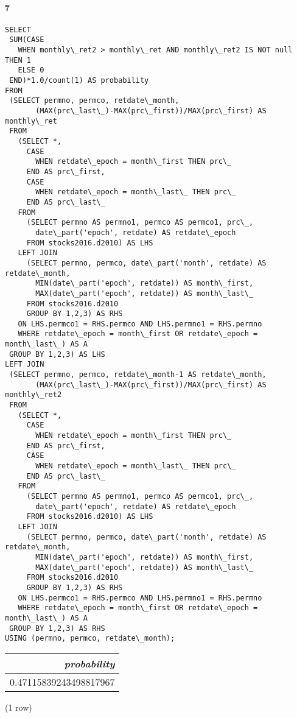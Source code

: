 \documentclass[]{article}
\let\oldparagraph\paragraph
\renewcommand{\paragraph}[1]{\oldparagraph{#1}\mbox{}}
\begin{document}
\paragraph{7}

\color{blue}
\begin{verbatim}
SELECT
 SUM(CASE
   WHEN monthly\_ret2 > monthly\_ret AND monthly\_ret2 IS NOT null THEN 1
   ELSE 0
 END)*1.0/count(1) AS probability
FROM
 (SELECT permno, permco, retdate\_month,
       (MAX(prc\_last\_)-MAX(prc\_first))/MAX(prc\_first) AS monthly\_ret
 FROM
   (SELECT *,
     CASE
       WHEN retdate\_epoch = month\_first THEN prc\_
     END AS prc\_first,
     CASE
       WHEN retdate\_epoch = month\_last\_ THEN prc\_
     END AS prc\_last\_
   FROM
     (SELECT permno AS permno1, permco AS permco1, prc\_,
       date\_part('epoch', retdate) AS retdate\_epoch
     FROM stocks2016.d2010) AS LHS
   LEFT JOIN
     (SELECT permno, permco, date\_part('month', retdate) AS retdate\_month,
       MIN(date\_part('epoch', retdate)) AS month\_first,
       MAX(date\_part('epoch', retdate)) AS month\_last\_
     FROM stocks2016.d2010
     GROUP BY 1,2,3) AS RHS
   ON LHS.permco1 = RHS.permco AND LHS.permno1 = RHS.permno
   WHERE retdate\_epoch = month\_first OR retdate\_epoch = month\_last\_) AS A
 GROUP BY 1,2,3) AS LHS
LEFT JOIN
 (SELECT permno, permco, retdate\_month-1 AS retdate\_month,
       (MAX(prc\_last\_)-MAX(prc\_first))/MAX(prc\_first) AS monthly\_ret2
 FROM
   (SELECT *,
     CASE
       WHEN retdate\_epoch = month\_first THEN prc\_
     END AS prc\_first,
     CASE
       WHEN retdate\_epoch = month\_last\_ THEN prc\_
     END AS prc\_last\_
   FROM
     (SELECT permno AS permno1, permco AS permco1, prc\_,
       date\_part('epoch', retdate) AS retdate\_epoch
     FROM stocks2016.d2010) AS LHS
   LEFT JOIN
     (SELECT permno, permco, date\_part('month', retdate) AS retdate\_month,
       MIN(date\_part('epoch', retdate)) AS month\_first,
       MAX(date\_part('epoch', retdate)) AS month\_last\_
     FROM stocks2016.d2010
     GROUP BY 1,2,3) AS RHS
   ON LHS.permco1 = RHS.permco AND LHS.permno1 = RHS.permno
   WHERE retdate\_epoch = month\_first OR retdate\_epoch = month\_last\_) AS A
 GROUP BY 1,2,3) AS RHS
USING (permno, permco, retdate\_month);
\end{verbatim}
\color{black}

\begin{center}
\begin{tabular}{r}
\textit{probability} \\
\hline
0.47115839243498817967 \\
\end{tabular}

\noindent (1 row) \\
\end{center}
\end{document}
